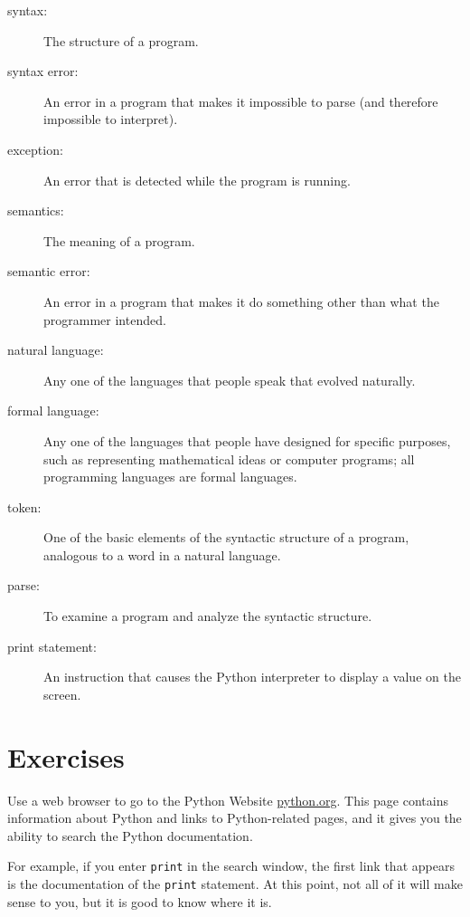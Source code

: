 \documentclass[10pt]{book}
\begin{document}
\begin{description}
\item[syntax:]  The structure of a program.

\item[syntax error:]  An error in a program that makes it impossible
to parse (and therefore impossible to interpret).

\item[exception:]  An error that is detected while the program is running.

\item[semantics:]  The meaning of a program.

\item[semantic error:]   An error in a program that makes it do something
other than what the programmer intended.

\item[natural language:]  Any one of the languages that people speak that
evolved naturally.

\item[formal language:]  Any one of the languages that people have designed
for specific purposes, such as representing mathematical ideas or
computer programs; all programming languages are formal languages.

\item[token:]  One of the basic elements of the syntactic structure of
a program, analogous to a word in a natural language.

\item[parse:]  To examine a program and analyze the syntactic structure.

\item[print statement:]  An instruction that causes the Python
interpreter to display a value on the screen.


\end{description}


\section{Exercises}

\begin{ex}
Use a web browser to go to the Python Website \url{python.org}.
This page contains information about Python and links
to Python-related pages, and it gives you the ability to search
the Python documentation.

For example, if you enter {\tt print} in the search window, the
first link that appears is the documentation of the {\tt print}
statement.  At this point, not all of it will make sense to you,
but it is good to know where it is.

\end{ex}
\end{document}
